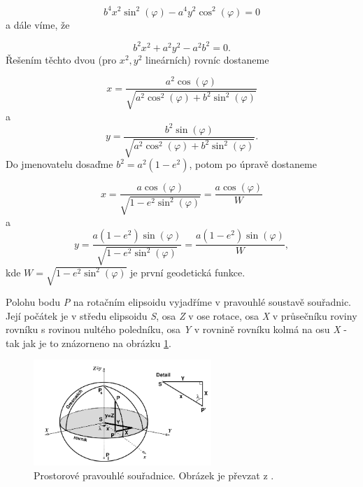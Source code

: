 \documentclass[11pt,a4paper]{article}
\begin{document}
\begin{equation}
b^{4}x^{2}\sin^{2}{\left(\varphi\right)} - a^{4}y^{2}\cos^{2}{\left(\varphi\right)} = 0
\end{equation}
a dále víme, že

\begin{equation}
b^{2}x^{2} + a^{2}y^{2} - a^{2}b^{2} = 0.
\end{equation}
Řešením těchto dvou (pro $x^{2}, y^{2}$ lineárních) rovníc dostaneme

\begin{equation}
x =\dfrac{a^{2}\cos{\left(\varphi\right)}}{\sqrt{a^{2}\cos^{2}{\left(\varphi\right)} + b^{2}\sin^{2}{\left(\varphi\right)}}}
\end{equation}
a
\begin{equation}
y =\dfrac{b^{2}\sin{\left(\varphi\right)}}{\sqrt{a^{2}\cos^{2}{\left(\varphi\right)} + b^{2}\sin^{2}{\left(\varphi\right)}}}.
\end{equation}
Do jmenovatelu dosaďme $b^{2} = a^{2}\left(1-e^{2}\right)$, potom po úpravě dostaneme

\begin{equation}
x =\dfrac{a\cos{\left(\varphi\right)}}{\sqrt{1-e^{2}\sin^{2}{\left(\varphi\right)}}} = \dfrac{a\cos{\left(\varphi\right)}}{W}
\label{rov:cimbX}
\end{equation}
a
\begin{equation}
y =\dfrac{a\left(1-e^{2}\right)\sin{\left(\varphi\right)}}{\sqrt{1-e^{2}\sin^{2}{\left(\varphi\right)}}} = \dfrac{a\left(1-e^{2}\right)\sin{\left(\varphi\right)}}{W},
\label{rov:cimbY}
\end{equation}
kde 
$W = \sqrt{1-e^{2}\sin^{2}{\left(\varphi\right)}}$ je první geodetická funkce.

Polohu bodu \textit{P} na rotačním elipsoidu vyjadříme v pravouhlé soustavě souřadnic. Její počátek je v středu elipsoidu \textit{S}, osa \textit{Z} v ose rotace, osa \textit{X} v průsečníku roviny rovníku s rovinou nultého poledníku, osa \textit{Y} v rovnině rovníku kolmá na osu \textit{X} - tak jak je to znázorneno na obrázku \ref{fig:cim116}.

\begin{figure}[ht!]
\begin{center}

\includegraphics[width=0.60\textwidth]{FIG/CimbalnikObr1-16}
\caption{Prostorové pravouhlé souřadnice. Obrázek je převzat z \cite{Cimbalnik1997}.}
\label{fig:cim116}
\end{center}
\end{figure}
\end{document}
